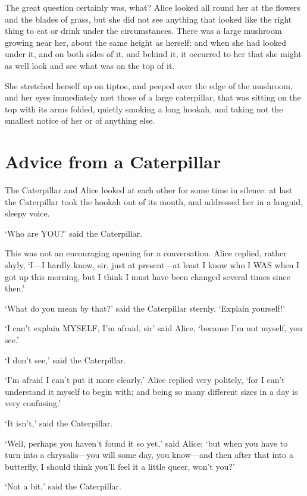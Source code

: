 \documentclass[12pt]{book}
\begin{document}
\begin{Parallel}[p]{}{}
{The great question certainly was, what? Alice looked all round her at the flowers and the blades of grass, but she did not see anything that looked like the right thing to eat or drink under the circumstances. There was a large mushroom growing near her, about the same height as herself; and when she had looked under it, and on both sides of it, and behind it, it occurred to her that she might as well look and see what was on the top of it.

She stretched herself up on tiptoe, and peeped over the edge of the mushroom, and her eyes immediately met those of a large caterpillar, that was sitting on the top with its arms folded, quietly smoking a long hookah, and taking not the smallest notice of her or of anything else.




\section{Advice from a Caterpillar}

The Caterpillar and Alice looked at each other for some time in silence: at last the Caterpillar took the hookah out of its mouth, and addressed her in a languid, sleepy voice.

‘Who are YOU?’ said the Caterpillar.

This was not an encouraging opening for a conversation. Alice replied, rather shyly, ‘I—I hardly know, sir, just at present—at least I know who I WAS when I got up this morning, but I think I must have been changed several times since then.’

‘What do you mean by that?’ said the Caterpillar sternly. ‘Explain yourself!’

‘I can’t explain MYSELF, I’m afraid, sir’ said Alice, ‘because I’m not myself, you see.’

‘I don’t see,’ said the Caterpillar.

‘I’m afraid I can’t put it more clearly,’ Alice replied very politely, ‘for I can’t understand it myself to begin with; and being so many different sizes in a day is very confusing.’

‘It isn’t,’ said the Caterpillar.

‘Well, perhaps you haven’t found it so yet,’ said Alice; ‘but when you have to turn into a chrysalis—you will some day, you know—and then after that into a butterfly, I should think you’ll feel it a little queer, won’t you?’

‘Not a bit,’ said the Caterpillar.

}
\end{Parallel}
\end{document}
